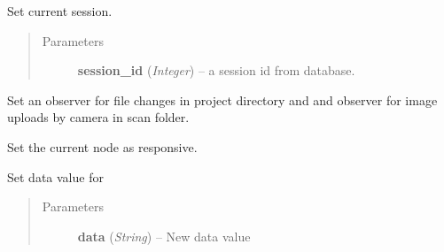 \documentclass[letterpaper,10pt,english]{sphinxmanual}
\begin{document}
\begin{fulllineitems}
\begin{fulllineitems}
\end{fulllineitems}


\begin{fulllineitems}
\label{state:state.State.set_current_session}
Set current session.
\begin{quote}\begin{description}
\item[{Parameters}] \leavevmode
\textbf{session\_id} (\emph{Integer}) -- a session id from database.

\end{description}\end{quote}

\end{fulllineitems}


\begin{fulllineitems}
\label{state:state.State.set_observer}
Set an observer for file changes in project directory and
and observer for image uploads by camera in scan folder.

\end{fulllineitems}


\begin{fulllineitems}
\label{state:state.State.set_responsive}
Set the current node as responsive.

\end{fulllineitems}


\begin{fulllineitems}
\label{state:state.State.set_swnp_data}
Set data value for {\hyperref[swnp:swnp.Node]{}}
\begin{quote}\begin{description}
\item[{Parameters}] \leavevmode
\textbf{data} (\emph{String}) -- New data value

\end{description}\end{quote}


\end{fulllineitems}
\end{fulllineitems}
\end{document}
